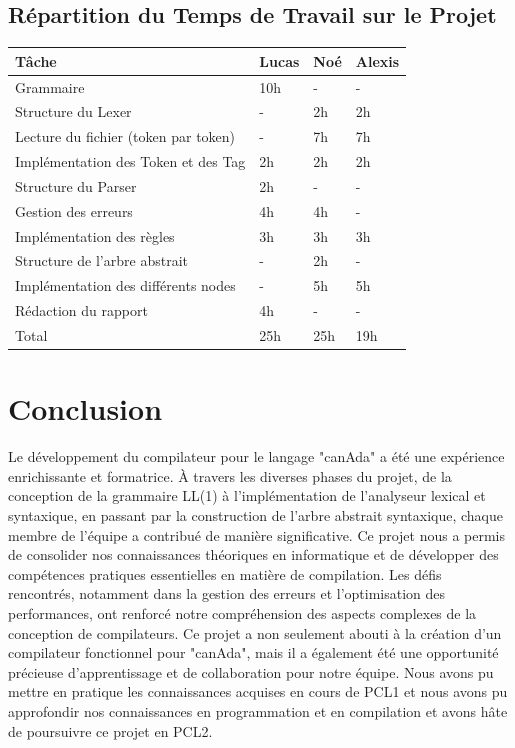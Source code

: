\documentclass[french,a4paper]{article}
\begin{document}
    \subsection{Répartition du Temps de Travail sur le Projet}\label{subsec:repartition-du-temps-de-travail-sur-le-projet}

    \begin{tabular}{@{}llll@{}}
        \toprule
        Tâche & Lucas & Noé & Alexis \\ \midrule
        Grammaire & 10h & - & - \\
        Structure du Lexer & - & 2h & 2h \\
        Lecture du fichier (token par token) & - & 7h & 7h \\
        Implémentation des Token et des Tag & 2h & 2h & 2h \\
        Structure du Parser & 2h & - & - \\
        Gestion des erreurs & 4h & 4h & - \\
        Implémentation des règles & 3h & 3h & 3h \\
        Structure de l'arbre abstrait & - & 2h & - \\
        Implémentation des différents nodes & - & 5h & 5h \\
        Rédaction du rapport & 4h & - & - \\
        \midrule
        Total & 25h & 25h & 19h \\ \bottomrule
    \end{tabular}

\section{Conclusion}\label{sec:conclusion}

    Le développement du compilateur pour le langage "canAda" a été une expérience enrichissante et formatrice. À travers les diverses phases du projet, de la conception de la grammaire LL(1) à l'implémentation de l'analyseur lexical et syntaxique, en passant par la construction de l'arbre abstrait syntaxique, chaque membre de l'équipe a contribué de manière significative. Ce projet nous a permis de consolider nos connaissances théoriques en informatique et de développer des compétences pratiques essentielles en matière de compilation. Les défis rencontrés, notamment dans la gestion des erreurs et l'optimisation des performances, ont renforcé notre compréhension des aspects complexes de la conception de compilateurs. Ce projet a non seulement abouti à la création d'un compilateur fonctionnel pour "canAda", mais il a également été une opportunité précieuse d'apprentissage et de collaboration pour notre équipe.
Nous avons pu mettre en pratique les connaissances acquises en cours de PCL1 et nous avons pu approfondir nos connaissances en programmation et en compilation et avons hâte de poursuivre ce projet en PCL2.
\end{document}
